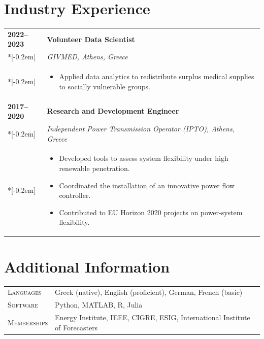 \documentclass[11pt,a4paper]{article}
\makeatletter
\newlength{\datecolwidth}
\newenvironment{entrylist}{%
  \begin{longtable}{@{}p{\datecolwidth}@{\hspace{0.8em}}p{\dimexpr\linewidth-\datecolwidth-0.8em\relax}@{}}%
}{\end{longtable}}
\newcommand{\entry}[4]{%
  \textbf{#1} & \textbf{#2}\\*[-0.2em]
              & {\itshape #3}\\*[-0.2em]
              & #4\\[0.8em]
}
\newcommand{\labelstyle}[1]{\textsc{#1}}   %
\newcommand{\entrylabel}[2]{%
  \labelstyle{#1} & #2\\[0.8em]
}
\makeatother
\begin{document}
\section*{Industry Experience}
\begin{entrylist}
  \entry{2022--2023}{Volunteer Data Scientist}{GIVMED, Athens, Greece}{
    \begin{itemize}
      \vspace{-0.4em}
      \item Applied data analytics to redistribute surplus medical supplies to socially vulnerable groups.
    \end{itemize}
  }
  \entry{2017--2020}{Research and Development Engineer}{Independent Power Transmission Operator (IPTO), Athens, Greece}{
    \begin{itemize}
      \vspace{-0.4em}
      \item Developed tools to assess system flexibility under high renewable penetration.
      \item Coordinated the installation of an innovative power flow controller.
      \item Contributed to EU Horizon 2020 projects on power-system flexibility.
    \end{itemize}
  }
\end{entrylist}

\section*{Additional Information}
\begin{entrylist}
    \entrylabel{Languages}{
      Greek (native), English (proficient), German, French (basic)}
      \entrylabel{Software}{
      Python, MATLAB, R, Julia}
      \entrylabel{Memberships}{
      Energy Institute, IEEE, CIGRE, ESIG, International Institute of Forecasters
  }

\end{entrylist}
\end{document}
